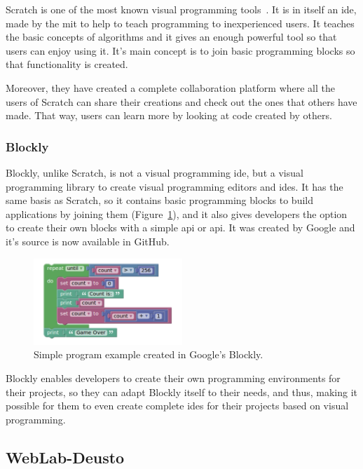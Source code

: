 Scratch is one of the most known visual programming tools~\cite{scratch}. It is in itself an
\acrshort{ide}, made by the \acrshort{mit} to help to teach programming to inexperienced users. It
teaches the basic concepts of algorithms and it gives an enough powerful tool so that users can
enjoy using it. It's main concept is to join basic programming blocks so that functionality is
created.

Moreover, they have created a complete collaboration platform where all the users of Scratch can
share their creations and check out the ones that others have made. That way, users can learn more
by looking at code created by others.

\subsubsection{Blockly}

Blockly, unlike Scratch, is not a visual programming \acrshort{ide}, but a visual programming
library to create visual programming editors and \acrshort{ide}s. It has the same basis as Scratch,
so it contains basic programming blocks to build applications by joining them
(Figure~\ref{fig:blockly}), and it also gives developers the option to create their own blocks with
a simple \acrlong{api} or \acrshort{api}. It was created by Google and it's source is now available
in GitHub.

\begin{figure}[!htbp]
	\centering
	\includegraphics[width=0.5\textwidth]{fig/blockly}
	\caption{Simple program example created in Google's Blockly.}\label{fig:blockly}
\end{figure}

Blockly enables developers to create their own programming environments for their projects, so they
can adapt Blockly itself to their needs, and thus, making it possible for them to even create
complete \acrshort{ide}s for their projects based on visual programming.

\subsection{WebLab-Deusto}

